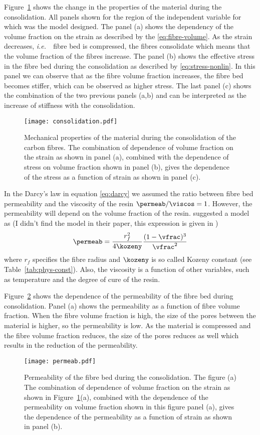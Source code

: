 \documentclass[twoside,a4paper,12pt]{article}
\newcommand{\figref}[1]{Figure~\ref{#1}}
\newcommand{\tabref}[1]{Table~\ref{#1}}
\newcommand{\ie}{{\it i.e.\ }}
\newcommand{\note}[1]{{\color{red}(#1)}}
\begin{document}
\figref{fig:consolidation} shows the change in the properties of the material during the consolidation. All panels shown for the region of the independent variable for which was the model designed. The panel (a) shows the dependency of the volume fraction on the strain as described by the \eqref{eq:fibre-volume}. As the strain decreases, \ie\ fibre bed is compressed, the fibres consolidate which means that the volume fraction of the fibres increase. The panel (b) shows the effective stress in the fibre bed during the consolidation as described by \eqref{eq:stress-nonlin}. In this panel we can observe that as the fibre volume fraction increases, the fibre bed becomes stiffer, which can be observed as higher stress. The last panel (c) shows the combination of the two previous panels (a,b) and can be interpreted as the increase of stiffness with the consolidation.
%
\begin{figure}
  \centering
  \texttt{[image: consolidation.pdf]}
  \caption{Mechanical properties of the material during the consolidation of the carbon fibres. The combination of dependence of volume fraction on the strain as shown in panel (a), combined with the dependence of stress on volume fraction shown in panel (b), gives the dependence of the stress as a function of strain as shown in panel (c).}
  \label{fig:consolidation}
\end{figure}

In the Darcy's law in equation \eqref{eq:darcy} we assumed the ratio
between fibre bed permeability and the viscosity of the resin
$\permeab/\viscos=1$. However, the permeability will depend on the volume
fraction of the resin. \citet{Dave1987b} suggested a model as
%
\note{I didn't find the model in their paper, this expression is given in \citet{Hubert1999}}
%
\begin{align}
  \permeab = \frac{r_f^2}{4\kozeny} \frac{(1-\vfrac)^3}{\vfrac^2} \label{eq:permeability}
\end{align}
%
where $r_f$ specifies the fibre radius and $\kozeny$ is so called Kozeny
constant (see \tabref{tab:phys-const}). Also, the viscosity is a
function of other variables, such as temperature and the degree of
cure of the resin.

\figref{fig:permeab} shows the dependence of the permeability of the fibre bed during consolidation. Panel (a) shows the permeability as a function of  fibre volume fraction. When the fibre volume fraction is  high, the size of the pores between the material is higher, so the permeability is low. As the material is compressed and the fibre volume fraction reduces, the size of the pores reduces as well which results in the reduction of the permeability.
%
\begin{figure}
  \centering
  \texttt{[image: permeab.pdf]}
  \caption{Permeability of the fibre bed during the consolidation.
    The figure (a) The combination of dependence of volume fraction on
    the strain as shown in \figref{fig:consolidation}(a), combined
      with the dependence of the permeability on volume fraction shown
      in this figure panel (a), gives the dependence of the
      permeability as a function of strain as shown in panel (b).}
  \label{fig:permeab}
\end{figure}
\end{document}
